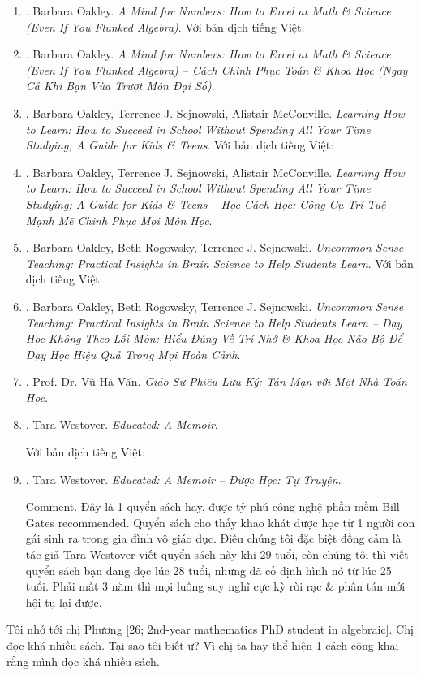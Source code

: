 \documentclass[12pt,oneside]{book}
\begin{document}
\begin{enumerate}
	{\sf Comment.} 1 quyển sách mà các bạn học sinh trường chuyên, đặc biệt là các bạn nằm trong đội tuyển thi học sinh giỏi các cấp nên tìm đọc.
	\item \cite{Oakley_mind_number}. {\sc Barbara Oakley}. {\it A Mind for Numbers: How to Excel at Math \& Science (Even If You Flunked Algebra)}. Với bản dịch tiếng Việt:
	\item \cite{Oakley_mind_number_VN}. {\sc Barbara Oakley}. {\it A Mind for Numbers: How to Excel at Math \& Science (Even If You Flunked Algebra) -- Cách Chinh Phục Toán \& Khoa Học (Ngay Cả Khi Bạn Vừa Trượt Môn Đại Số)}.
	\item \cite{Oakley_Sejnowski_McConville_learn_how_learn}. {\sc Barbara Oakley, Terrence J. Sejnowski, Alistair McConville}. {\it Learning How to Learn: How to Succeed in School Without Spending All Your Time Studying; A Guide for Kids \& Teens}. Với bản dịch tiếng Việt:
	\item \cite{Oakley_Sejnowski_McConville_learn_how_learn_VN}. {\sc Barbara Oakley, Terrence J. Sejnowski, Alistair McConville}. {\it Learning How to Learn: How to Succeed in School Without Spending All Your Time Studying; A Guide for Kids \& Teens -- Học Cách Học: Công Cụ Trí Tuệ Mạnh Mẽ Chinh Phục Mọi Môn Học}.
	\item \cite{Oakley_Rogowsky_Sejnowski_McConville_uncommon_sense_teaching}. {\sc Barbara Oakley, Beth Rogowsky, Terrence J. Sejnowski}. {\it Uncommon Sense Teaching: Practical Insights in Brain Science to Help Students Learn}. Với bản dịch tiếng Việt:
	\item \cite{Oakley_Rogowsky_Sejnowski_McConville_uncommon_sense_teaching_VN}. {\sc Barbara Oakley, Beth Rogowsky, Terrence J. Sejnowski}. {\it Uncommon Sense Teaching: Practical Insights in Brain Science to Help Students Learn -- Dạy Học Không Theo Lối Mòn: Hiểu Đúng Về Trí Nhớ \& Khoa Học Não Bộ Để Dạy Học Hiệu Quả Trong Mọi Hoàn Cảnh}.
	\item \cite{VanVu2022}. Prof. Dr. {\sc Vũ Hà Văn}. {\it Giáo Sư Phiêu Lưu Ký: Tản Mạn với Một Nhà Toán Học}.
	\item \cite{Westover_educated}. {\sc Tara Westover}. {\it Educated: A Memoir}.
	
	Với bản dịch tiếng Việt:
	\item \cite{Westover_educated_VN}. {\sc Tara Westover}. {\it Educated: A Memoir -- Được Học: Tự Truyện}.
	
	{\sf Comment.} Đây là 1 quyển sách hay, được tỷ phú công nghệ phần mềm {\sc Bill Gates} recommended. Quyển sách cho thấy khao khát được học từ 1 người con gái sinh ra trong gia đình vô giáo dục. Điều chúng tôi đặc biệt đồng cảm là tác giả {\sc Tara Westover} viết quyển sách này khi 29 tuổi, còn chúng tôi thì viết quyển sách bạn đang đọc lúc 28 tuổi, nhưng đã cố định hình nó từ lúc 25 tuổi. Phải mất 3 năm thì mọi luồng suy nghĩ cực kỳ rời rạc \& phân tán mới hội tụ lại được.
\end{enumerate}
Tôi nhớ tới chị {\sf Phương [26; 2nd-year mathematics PhD student in algebraic]}. Chị đọc khá nhiều sách. Tại sao tôi biết ư? Vì chị ta hay thể hiện 1 cách công khai rằng mình đọc khá nhiều sách.
\end{document}
